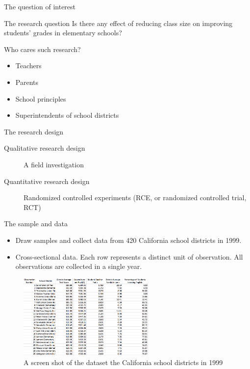 \documentclass[presentation]{beamer}
\begin{document}
\begin{frame}[label={sec:orgca0e4e3}]{The question of interest}
\begin{block}{The research question}
Is there any effect of reducing class size on improving students' grades in
elementary schools?
\end{block}

\begin{block}{Who cares such research?}
\begin{itemize}
\item Teachers
\item Parents
\item School principles
\item Superintendents of school districts
\end{itemize}
\end{block}
\end{frame}

\begin{frame}[label={sec:org10415a5}]{The research design}
\begin{description}
\item[{Qualitative research design}] A field investigation

\item[{Quantitative research design}] Randomized controlled experiments
(RCE, or randomized controlled trial, RCT)
\end{description}
\end{frame}

\begin{frame}[label={sec:org0f3a1c4}]{The sample and data}
\begin{itemize}
\item Draw samples and collect data from 420 California school districts
in 1999.
\item Cross-sectional data. Each row represents a distinct unit of
observation. All observations are collected in a single year.
\end{itemize}

\begin{figure}[htbp]
\centering
\includegraphics[width=0.6\textwidth,height=0.5\textheight]{figure/table1_1.png}
\caption{\label{fig:orgda30687}
A screen shot of the dataset the California school districts in 1999}
\end{figure}
\end{frame}
\end{document}

